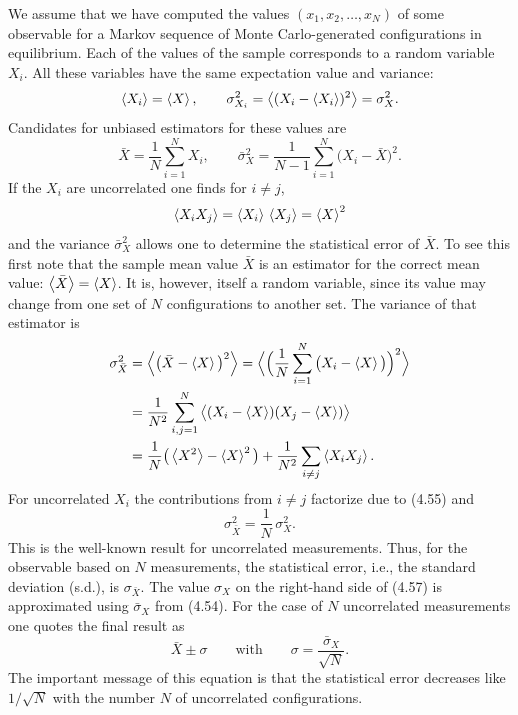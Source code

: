 We assume that we have computed the values $(x_1, x_2, \ldots, x_N)$ of some observable for a Markov sequence of Monte Carlo-generated configurations in
equilibrium. Each of the values of the sample corresponds to a random variable $X_i$. All these variables have the same expectation value and variance:
\begin{equation}
  \left\langle X_i \right\rangle = \left\langle X \right\rangle, \qquad
  \sigma_{X_i}^2 = \big\langle (X_i - \left\langle X_i \right\rangle)^2\big\rangle = \sigma_X^2 .
\end{equation}
Candidates for unbiased estimators for these values are
\begin{equation}
  \bar{X} = \frac{1}{N}\sum_{i=1}^{N} X_i, \qquad
  \bar{\sigma}_X^2 = \frac{1}{N-1}\sum_{i=1}^{N}\big(X_i - \bar{X}\big)^2 .
\end{equation}
If the $X_i$ are uncorrelated one finds for $i \neq j$,
\begin{equation}
  \left\langle X_i X_j \right\rangle = \left\langle X_i \right\rangle\,\left\langle X_j \right\rangle = \left\langle X \right\rangle^2
\end{equation}
and the variance $\bar{\sigma}_X^2$ allows one to determine the statistical error of $\bar{X}$.
To see this first note that the sample mean value $\bar{X}$ is an estimator for the correct
mean value: $\left\langle \bar{X} \right\rangle = \left\langle X \right\rangle$. It is, however, itself a random variable, since its value
may change from one set of $N$ configurations to another set. The variance of
that estimator is
\begin{equation}
  \begin{split}
    \sigma_{\bar{X}}^2 &= \Big\langle\big(\bar{X} - \left\langle X \right\rangle\big)^2\Big\rangle
    = \Big\langle\Big(\frac{1}{N}\sum_{i=1}^{N}\big(X_i - \left\langle X \right\rangle\big)\Big)^2\Big\rangle \\
    &= \frac{1}{N^2}\sum_{i,j=1}^{N}\big\langle (X_i - \left\langle X \right\rangle)(X_j - \left\langle X \right\rangle)\big\rangle \\
    &= \frac{1}{N}\big(\left\langle X^2 \right\rangle - \left\langle X \right\rangle^2\big) + \frac{1}{N^2}\sum_{i\neq j}\left\langle X_i X_j \right\rangle.
  \end{split}
\end{equation}
For uncorrelated $X_i$ the contributions from $i \neq j$ factorize due to (4.55) and
\begin{equation}
  \sigma_{\bar{X}}^2 = \frac{1}{N}\,\sigma_X^2 .
\end{equation}
This is the well-known result for uncorrelated measurements. Thus, for the
observable based on $N$ measurements, the statistical error, i.e., the standard
deviation (s.d.), is $\sigma_{\bar{X}}$. The value $\sigma_X$ on the right-hand side of (4.57) is approximated using $\bar{\sigma}_X$ from (4.54). For the case of $N$ uncorrelated measurements
one quotes the final result as
\begin{equation}
  \bar{X} \pm \sigma \qquad \text{with}\qquad \sigma = \frac{\bar{\sigma}_X}{\sqrt{N}} .
\end{equation}
The important message of this equation is that the statistical error decreases
like $1/\sqrt{N}$ with the number $N$ of uncorrelated configurations.

